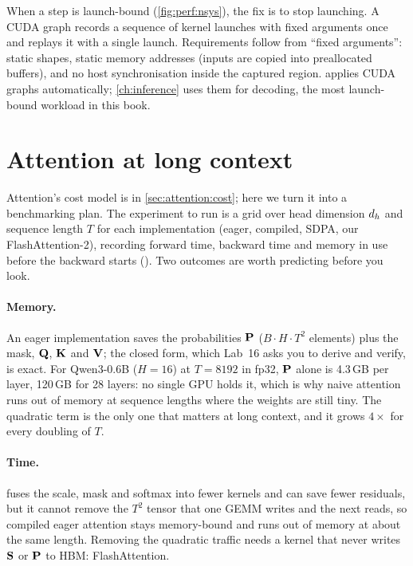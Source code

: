 \begin{deepdive}
When a step is launch-bound (\cref{fig:perf:nsys}), the fix is to stop launching. A CUDA graph
records a sequence of kernel launches with fixed arguments once and replays it with a single
launch. Requirements follow from ``fixed arguments'': static shapes, static memory addresses (inputs
are copied into preallocated buffers), and no host synchronisation inside the captured region.
 applies CUDA graphs automatically; \cref{ch:inference}
uses them for decoding, the most launch-bound workload in this book.
\end{deepdive}

\section{Attention at long context}\label{sec:perf:attn}

Attention's cost model is in \cref{sec:attention:cost}; here we turn it into a benchmarking plan.
The experiment to run is a grid over head dimension $d_{h}$ and sequence length $T$ for each
implementation (eager, compiled, SDPA, our FlashAttention-2), recording forward time, backward time
and memory in use before the backward starts (). Two outcomes are worth
predicting before you look.

\paragraph{Memory.} An eager implementation saves the probabilities $\mathbf{P}$
($B\cdot H\cdot T^2$ elements) plus the mask, $\mathbf{Q}$, $\mathbf{K}$ and $\mathbf{V}$; the closed form,
which Lab~16 asks you to derive and verify, is exact. For Qwen3-0.6B ($H=16$) at $T=8192$ in fp32,
$\mathbf{P}$ alone is 4.3\,GB per layer, 120\,GB for 28 layers: no single GPU holds it, which is why
naive attention runs out of memory at sequence lengths where the weights are still tiny. The quadratic
term is the only one that matters at long context, and it grows $4\times$ for every doubling of $T$.

\paragraph{Time.}  fuses the scale, mask and softmax into fewer kernels and
can save fewer residuals, but it cannot remove the $T^2$ tensor that one GEMM writes and the next
reads, so compiled eager attention stays memory-bound and runs out of memory at about the same
length. Removing the quadratic traffic needs a kernel that never writes $\mathbf{S}$ or $\mathbf{P}$ to
HBM: FlashAttention.

